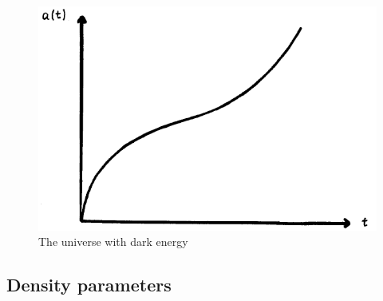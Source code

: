 \begin{figure}[ht]
\begin{center}
\includegraphics[scale=0.5]{Draw/lec6_4.png}
\end{center}
\caption{The universe with dark energy}
\label{fig:lec6_4}
\end{figure}

\subsection{Density parameters}

